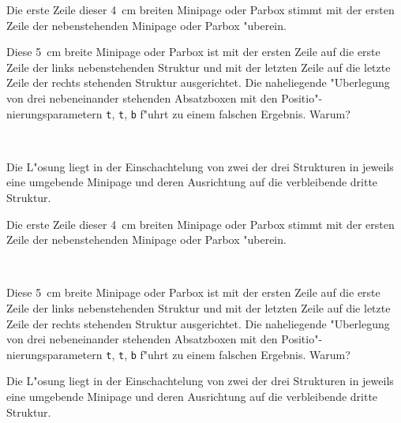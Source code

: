 \documentclass{article}
\begin{document}
\footnotesize\noindent
\begin{minipage}[b]{92.50mm}
\parbox[t]{40mm}{Die erste Zeile dieser 4~cm brei\-ten Minipage oder Parbox
stimmt mit der ersten Zeile der nebenstehenden Minipage oder Parbox "uberein.}
\hfill
\parbox[t]{50mm}{Diese 5~cm breite Minipage oder Parbox ist mit der ersten
Zeile auf die erste Zeile der links nebenstehenden Struktur und mit der
letzten Zeile auf die letzte Zeile der rechts stehenden Struktur ausgerichtet.
Die naheliegende "Uber\-legung von drei nebeneinander stehenden Absatzboxen
mit den Positio"-nierungsparametern {\tt t}, {\tt t}, {\tt b} f"uhrt zu
einem falschen Ergebnis. Warum?}\\[-3pt] \mbox{}
\end{minipage}\hfill
\parbox[b]{35mm}{Die L"osung liegt in der Einschachtelung von zwei der drei
Strukturen in jeweils eine umgebende Minipage und deren Ausrichtung auf die
verbleibende dritte Struktur.} 

\vspace{10mm}\noindent
\parbox[t]{40mm}{Die erste Zeile dieser 4~cm brei\-ten Minipage oder Parbox
stimmt mit der ersten Zeile der nebenstehenden Minipage oder Parbox "uberein.}
\hfill
\begin{minipage}[t]{87.5mm}\mbox{}\\[-6pt]
\parbox[b]{50mm}{Diese 5~cm breite Minipage oder Parbox ist mit der ersten
Zeile auf die erste Zeile der links nebenstehenden Struktur und mit der
letzten Zeile auf die letzte Zeile der rechts stehenden Struktur ausgerichtet.
Die naheliegende "Uber\-legung von drei nebeneinander stehenden Absatzboxen
mit den Positio"-nierungsparametern {\tt t}, {\tt t}, {\tt b} f"uhrt zu
einem falschen Ergebnis. Warum?}
\hfill
\parbox[b]{35mm}{Die L"osung liegt in der Einschachtelung von zwei der drei
Strukturen in jeweils eine umgebende Minipage und deren Ausrichtung auf die
verbleibende dritte Struktur.} 
\end{minipage}
\end{document}
